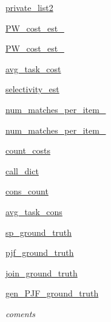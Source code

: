 \begin{DoxyCompactItemize}
\mbox{\hyperlink{classdynamicfilterapp_1_1models_1_1_join_aacba7fad0393ddea9ffe3688e2a984b1}{private\+\_\+list2}}
\item 
\mbox{\hyperlink{classdynamicfilterapp_1_1models_1_1_join_a83384c5efb00056d72e62f54090f162c}{P\+W\+\_\+cost\+\_\+est\+\_}}
\item 
\mbox{\hyperlink{classdynamicfilterapp_1_1models_1_1_join_a813429f929973d3f9b0d2f8e7f6b7c23}{P\+W\+\_\+cost\+\_\+est\+\_}}
\item 
\mbox{\hyperlink{classdynamicfilterapp_1_1models_1_1_join_a70729c52cf346cc8c79b2879f728cb99}{avg\+\_\+task\+\_\+cost}}
\item 
\mbox{\hyperlink{classdynamicfilterapp_1_1models_1_1_join_a69583dd8724a5380d6c68ce2edffe2d6}{selectivity\+\_\+est}}
\item 
\mbox{\hyperlink{classdynamicfilterapp_1_1models_1_1_join_a8cdba12f778c1ea03188373763c48eb7}{num\+\_\+matches\+\_\+per\+\_\+item\+\_}}
\item 
\mbox{\hyperlink{classdynamicfilterapp_1_1models_1_1_join_a8a9a495627c79f7bc67544c66197dd1c}{num\+\_\+matches\+\_\+per\+\_\+item\+\_}}
\item 
\mbox{\hyperlink{classdynamicfilterapp_1_1models_1_1_join_a6760579c97fc985690cdd3386effeb3c}{count\+\_\+costs}}
\item 
\mbox{\hyperlink{classdynamicfilterapp_1_1models_1_1_join_af3dc8873acbdc1634b41af003969d465}{call\+\_\+dict}}
\item 
\mbox{\hyperlink{classdynamicfilterapp_1_1models_1_1_join_ace3682116362edac4f94c633d82de3fb}{cons\+\_\+count}}
\item 
\mbox{\hyperlink{classdynamicfilterapp_1_1models_1_1_join_a59361dbf99fd8ba09b0b618a50d6c3b8}{avg\+\_\+task\+\_\+cons}}
\item 
\mbox{\hyperlink{classdynamicfilterapp_1_1models_1_1_join_a26373c16feba2f10410b78ea16841a21}{sp\+\_\+ground\+\_\+truth}}
\item 
\mbox{\hyperlink{classdynamicfilterapp_1_1models_1_1_join_a1ec302901059810f84b7fa227156b2e9}{pjf\+\_\+ground\+\_\+truth}}
\item 
\mbox{\hyperlink{classdynamicfilterapp_1_1models_1_1_join_a9bf599bb9db1e1a1e07cebc7424a15a7}{join\+\_\+ground\+\_\+truth}}
\item 
\mbox{\hyperlink{classdynamicfilterapp_1_1models_1_1_join_abbd60e6de881162d4729a417f6083f0c}{gen\+\_\+\+P\+J\+F\+\_\+ground\+\_\+truth}}
\begin{DoxyCompactList}\small\item\em coments \end{DoxyCompactList}\item 

\end{DoxyCompactItemize}

